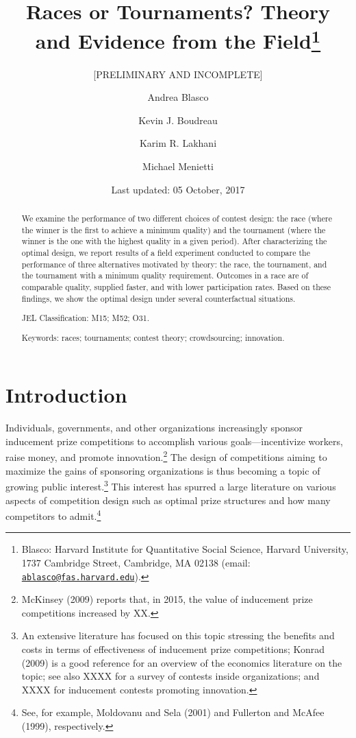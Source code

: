 \documentclass[11pt, titlepage]{article}
\title{Races or Tournaments? Theory and Evidence from the Field\thanks{Blasco: Harvard Institute for Quantitative Social Science, Harvard
University, 1737 Cambridge Street, Cambridge, MA 02138 (email:
\href{mailto:ablasco@fas.harvard.edu}{\nolinkurl{ablasco@fas.harvard.edu}}).}}
\subtitle{{[}PRELIMINARY AND INCOMPLETE{]}}
\author{Andrea Blasco \and Kevin J. Boudreau \and Karim R. Lakhani \and Michael Menietti}
\date{Last updated: 05 October, 2017}
\begin{document}
\maketitle
\begin{abstract}
We examine the performance of two different choices of contest design:
the race (where the winner is the first to achieve a minimum quality)
and the tournament (where the winner is the one with the highest quality
in a given period). After characterizing the optimal design, we report
results of a field experiment conducted to compare the performance of
three alternatives motivated by theory: the race, the tournament, and
the tournament with a minimum quality requirement. Outcomes in a race
are of comparable quality, supplied faster, and with lower participation
rates. Based on these findings, we show the optimal design under several
counterfactual situations.

\smallskip\noindent 
JEL Classification: M15; M52; O31.

\smallskip\noindent 
Keywords: races; tournaments; contest theory; crowdsourcing; innovation.
\end{abstract}


\clearpage
\tableofcontents
\setcounter{tocdepth}{2}
\clearpage

\section{Introduction}\label{introduction}

Individuals, governments, and other organizations increasingly sponsor
inducement prize competitions to accomplish various goals---incentivize
workers, raise money, and promote innovation.\footnote{McKinsey (2009)
  reports that, in 2015, the value of inducement prize competitions
  increased by XX.} The design of competitions aiming to maximize the
gains of sponsoring organizations is thus becoming a topic of growing
public interest.\footnote{An extensive literature has focused on this
  topic stressing the benefits and costs in terms of effectiveness of
  inducement prize competitions; Konrad (2009) is a good reference for
  an overview of the economics literature on the topic; see also XXXX
  for a survey of contests inside organizations; and XXXX for inducement
  contests promoting innovation.} This interest has spurred a large
literature on various aspects of competition design such as optimal
prize structures and how many competitors to admit.\footnote{See, for
  example, Moldovanu and Sela (2001) and Fullerton and McAfee (1999),
  respectively.}
\end{document}
